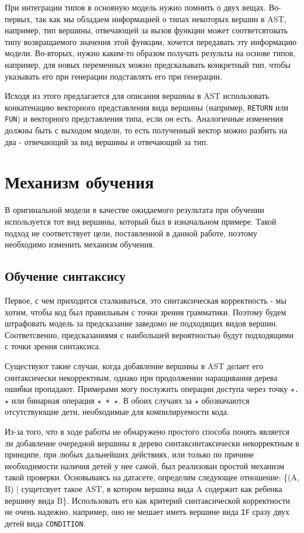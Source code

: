 \documentclass[times,specification,annotation]{itmo-student-thesis}
\begin{document}
При интеграции типов в основную модель нужно помнить о двух вещах. Во-первых, так как мы обладаем информацией о типах некоторых вершин в AST, например, тип вершины, отвечающей за вызов функции может соответсвтовать типу возвращаемого значения этой функции, хочется передавать эту информацию модели. Во-вторых, нужно каким-то образом получать результы на основе типов, например, для новых переменных можно предсказывать конкретный тип, чтобы указывать его при генерации подставлять его при генерации.

Исходя из этого предлагается для описания вершины в AST использовать конкатенацию векторного представления вида вершины (например, \texttt{RETURN} или \texttt{FUN}) и векторного представления типа, если он есть. Аналогичные изменения должны быть с выходом модели, то есть полученный вектор можно разбить на два - отвечающий за вид вершины и отвечающий за тип.

\section{Механизм обучения}\label{fit}
В оригинальной модели в качестве ожидаемого результата при обучении используется тот вид вершины, который был в изначальном примере. Такой подход не соответствует цели, поставленной в данной работе, поэтому необходимо изменить механизм обучения.

\subsection{Обучение синтаксису}\label{fit:syntax}
Первое, с чем приходится сталкиваться, это синтаксическая корректность - мы хотим, чтобы код был правильным с точки зрения грамматики. Поэтому будем штрафовать модель за предсказание заведомо не подходящих видов вершин. Соответсвенно, предсказаниямя с наибольшей вероятностью будут подходящими с точки зрения синтаксиса. 

Существуют такие случаи, когда добавление вершины в AST делает его синтаксически некорректным, однако при продолжении наращивания дерева ошибки пропадают. Примерами могу послужить операции доступа через точку \texttt{$\star$.$\star$} или бинарная операция \texttt{$\star$ + $\star$}. В обоих случаях за $\star$ обозначаются отсутствующие дети, необходимые для компилируемости кода.

Из-за того, что в ходе работы не обнаружено простого способа понять является ли добавление очередной вершины в дерево синтаксинтаксически некорректным в принципе, при любых дальнейших действиях, или только по причине необходимости наличия детей у нее самой, был реализован простой механизм такой проверки. Основываясь на датасете, определим следующее отношение: \{(A, B) | сущетсвует такое AST, в котором вершина вида A содержит как ребенка вершину вида B\}. Использовать его как критерий синтаксической корректности не очень надежно, например, оно не мешает иметь вершине вида \texttt{IF} сразу двух детей вида \texttt{CONDITION}.
\end{document}
